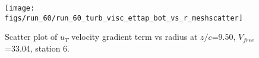 \begin{figure}[H]
\centering
\texttt{[image: figs/run\_60/run\_60\_turb\_visc\_ettap\_bot\_vs\_r\_meshscatter]}
\caption{Scatter plot of $
u_T$ velocity gradient term vs radius at $z/c$=9.50, $V_{free}$=33.04, station 6.}
\end{figure}


